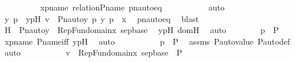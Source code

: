 \begin{isabellebody}
\ \ \ \ \ \ \ \ \isamarkupfalse%
\ xpname\ relation{\isacharunderscore}{\kern0pt}P{\isacharunderscore}{\kern0pt}name\ pnautoeq\ \isanewline
\ \ \ \ \ \ \ \ \isamarkupfalse%
\ auto\isanewline
\ \ \ \ \ \ \isamarkupfalse%
\ \isamarkupfalse%
\ y\ p\ \ ypH{\isacharcolon}{\kern0pt}\ {\isachardoublequoteopen}v\ {\isacharequal}{\kern0pt}\ {\isacharless}{\kern0pt}Pn{\isacharunderscore}{\kern0pt}auto{\isacharparenleft}{\kern0pt}{\isasympi}{\isacharparenright}{\kern0pt}{\isacharbackquote}{\kern0pt}y{\isacharcomma}{\kern0pt}\ {\isasympi}{\isacharbackquote}{\kern0pt}p{\isachargreater}{\kern0pt}{\isachardoublequoteclose}\ {\isachardoublequoteopen}{\isacharless}{\kern0pt}y{\isacharcomma}{\kern0pt}\ p{\isachargreater}{\kern0pt}\ {\isasymin}\ x{\isachardoublequoteclose}\ \isamarkupfalse%
\ pnautoeq\ \isamarkupfalse%
\ blast\isanewline
\ \ \ \ \ \ \isamarkupfalse%
\ \isamarkupfalse%
\ H\ {\isacharcolon}{\kern0pt}\ {\isachardoublequoteopen}Pn{\isacharunderscore}{\kern0pt}auto{\isacharparenleft}{\kern0pt}{\isasympi}{\isacharparenright}{\kern0pt}{\isacharbackquote}{\kern0pt}y\ {\isasymin}\ {\isasymUnion}RepFun{\isacharparenleft}{\kern0pt}domain{\isacharparenleft}{\kern0pt}x{}{\isacharparenright}{\kern0pt}{\isacharcomma}{\kern0pt}\ sep{\isacharunderscore}{\kern0pt}base{\isacharparenright}{\kern0pt}{\isachardoublequoteclose}\ \isamarkupfalse%
\ ypH\ domH\ \isamarkupfalse%
\ auto\isanewline
\ \ \ \ \ \ \isamarkupfalse%
\ {\isachardoublequoteopen}p\ {\isasymin}\ P{\isachardoublequoteclose}\ \isamarkupfalse%
\ xpname\ P{\isacharunderscore}{\kern0pt}name{\isacharunderscore}{\kern0pt}iff\ ypH\ \isamarkupfalse%
\ auto\ \isanewline
\ \ \ \ \ \ \isamarkupfalse%
\ \isamarkupfalse%
\ {\isachardoublequoteopen}{\isasympi}{\isacharbackquote}{\kern0pt}p\ {\isasymin}\ P{\isachardoublequoteclose}\ \isamarkupfalse%
\ assms\ P{\isacharunderscore}{\kern0pt}auto{\isacharunderscore}{\kern0pt}value\ P{\isacharunderscore}{\kern0pt}auto{\isacharunderscore}{\kern0pt}def\ \isamarkupfalse%
\ auto\ \isanewline
\ \ \ \ \ \ \isamarkupfalse%
\ \isamarkupfalse%
\ {\isachardoublequoteopen}v\ {\isasymin}\ {\isacharparenleft}{\kern0pt}{\isasymUnion}RepFun{\isacharparenleft}{\kern0pt}domain{\isacharparenleft}{\kern0pt}x{}{\isacharparenright}{\kern0pt}{\isacharcomma}{\kern0pt}\ sep{\isacharunderscore}{\kern0pt}base{\isacharparenright}{\kern0pt}\ {\isasymtimes}\ P{\isacharparenright}{\kern0pt}{\isachardoublequoteclose}\ \isamarkupfalse%

\end{isabellebody}
